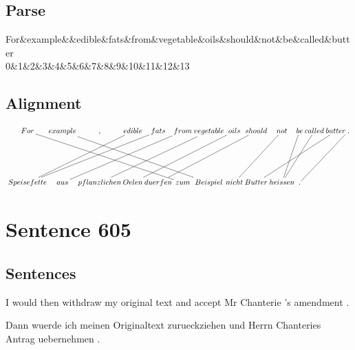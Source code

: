 \documentclass{report}
\begin{document}
\subsection*{Parse}
\begin{dependency}[theme=simple]
\begin{deptext}[column sep=.5cm, row sep=.1ex]
For\&example\&\&edible\&fats\&from\&vegetable\&oils\&should\&not\&be\&called\&butter\\
0\&1\&2\&3\&4\&5\&6\&7\&8\&9\&10\&11\&12\&13\\
\end{deptext}
\end{dependency}


\subsection*{Alignment}
\scriptsize{
$
\xymatrix@C-2.3pc{
For \ar @{-} [ddrrrrr] & example \ar @{-} [ddrrrrr] & , & edible \ar @{-} [ddlll] & fats \ar @{-} [ddllll] & from \ar @{-} [ddllll] & vegetable \ar @{-} [ddllll] & oils \ar @{-} [ddllll] & should \ar @{-} [ddllll] & not \ar @{-} [ddll] & be \ar @{-} [ddl] & called \ar @{-} [ddll] & butter \ar @{-} [ddllll] & . \ar @{-} [ddlll]\\\\
Speisefette & aus & pflanzlichen & Oelen & duerfen & zum & Beispiel & nicht & Butter & heissen & .
}$}
\newpage\section*{Sentence 605}

\subsection*{Sentences}
I would then withdraw my original text and accept Mr Chanterie 's amendment .

\noindent Dann wuerde ich meinen Originaltext zurueckziehen und Herrn Chanteries Antrag uebernehmen .
\end{document}
